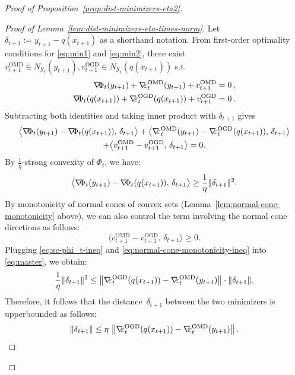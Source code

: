 \documentclass[a4paper,11pt,fullpage]{article}
\def\Y{{\mathcal Y}}
\theoremstyle{plain}
\theoremstyle{definition}
\theoremstyle{plain}
\let\nablaold\nabla
\renewcommand{\nabla}{\nablaold\mkern-2.5mu}
\begin{document}
\begin{proof}[Proof of Proposition~\ref{prop:dist-minimizers-eta2}]
\begin{proof}[Proof of Lemma~\ref{lem:dist-minimizers-eta-times-norm}]
Let $\delta_{t+1}:=y_{t+1}-q(x_{t+1})$ as a shorthand notation.  
From first-order optimality conditions for \eqref{eq:min1} and \eqref{eq:min2},
there exist $v_{t+1}^{\mathrm{OMD}} \in N_{\Y_t}(y_{t+1}), v_{t+1}^{\mathrm{OGD}} \in N_{\Y_t}(q(x_{t+1}))$ s.t. 
\begin{align*}
\nabla \Phi_t(y_{t+1})+\nabla \varepsilon_t^{\mathrm{OMD}}(y_{t+1})+v_{t+1}^{\mathrm{OMD}} &= 0\,,\\
\nabla \Phi_t(q(x_{t+1}))+\nabla \varepsilon_t^{\mathrm{OGD}}(q(x_{t+1}))+v_{t+1}^{\mathrm{OGD}} &= 0\,.
\end{align*}
Subtracting both identities and taking inner product with $\delta_{t+1}$ gives
\begin{multline}
\big\langle \nabla\Phi_t(y_{t+1})-\nabla\Phi_t(q(x_{t+1})),\,\delta_{t+1}\big\rangle
+ \big\langle \nabla\varepsilon_t^{\mathrm{OMD}}(y_{t+1})
- \nabla\varepsilon_t^{\mathrm{OGD}}(q(x_{t+1})),\,\delta_{t+1}\big\rangle \\
+ \big\langle v_{t+1}^{\mathrm{OMD}}-v_{t+1}^{\mathrm{OGD}}, \,\delta_{t+1} \big\rangle
=0.
\label{eq:master}
\end{multline}
By $\frac{1}{\eta}$-strong convexity of $\Phi_t$, we have: 
\begin{equation}
\label{eq:sc-phi_t-ineq}
\big\langle \nabla\Phi_t(y_{t+1})-\nabla\Phi_t(q(x_{t+1})), \,\delta_{t+1}\big\rangle
\ge \frac1\eta \|\delta_{t+1}\|^2.
\end{equation}
By monotonicity of normal cones of convex sets (Lemma~\ref{lem:normal-cone-monotonicity} above),
we can also control the term involving the normal cone directions as follows: 
\begin{equation}
\label{eq:normal-cone-monotonicity-ineq}
\big\langle v_{t+1}^{\mathrm{OMD}}-v_{t+1}^{\mathrm{OGD}}, \,\delta_{t+1} \big\rangle \ge 0.
\end{equation}
Plugging \eqref{eq:sc-phi_t-ineq} and \eqref{eq:normal-cone-monotonicity-ineq} into \eqref{eq:master}, we obtain: 
\begin{equation*}
\frac1\eta\|\delta_{t+1}\|^2
\le 
\left\| \nabla\varepsilon_t^{\mathrm{OGD}}(q(x_{t+1})) - \nabla\varepsilon_t^{\mathrm{OMD}}(y_{t+1}) \right\|
\cdot \|\delta_{t+1}\|.
\end{equation*}
Therefore, it follows that the distance~$\delta_{t+1}$ between the two minimizers is upperbounded as follows: 
\[
\|\delta_{t+1}\|
\le
\eta\,
\left\|
\nabla\varepsilon_t^{\mathrm{OGD}}(q(x_{t+1}))
-
\nabla\varepsilon_t^{\mathrm{OMD}}(y_{t+1})
\right\|.
\]
\end{proof}


\end{proof}
\end{document}
